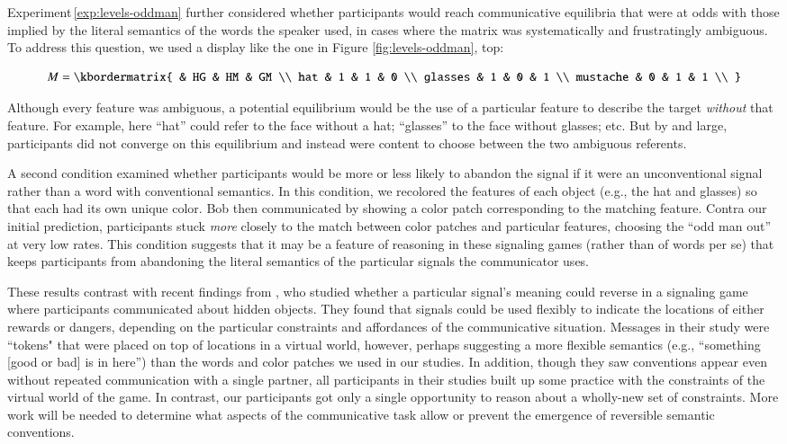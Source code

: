 \documentclass[man,noapacite]{apa2}
\newcounter{Experiment}
\newcommand{\exptref}[1]{Experiment\,\ref{#1}}
\begin{document}
\exptref{exp:levels-oddman} further considered whether participants would reach communicative equilibria that were at odds with those implied by the literal semantics of the words the speaker used, in cases where the matrix was systematically and frustratingly ambiguous. To address this question, we used a display like the one in Figure \ref{fig:levels-oddman}, top:

\begin{equation}
    M = \kbordermatrix{
               & HG & HM & GM \\
      hat      & 1  & 1  & 0  \\
      glasses  & 1  & 0  & 1 \\
      mustache & 0  & 1  & 1 \\
    }
\end{equation}

\noindent Although every feature was ambiguous, a potential equilibrium would be the use of a particular feature to describe the target \emph{without} that feature. For example, here ``hat'' could refer to the face without a hat; ``glasses'' to the face without glasses; etc. But by and large, participants did not converge on this equilibrium and instead were content to choose between the two ambiguous referents.

A second condition examined whether participants would be more or less likely to abandon the signal if it were an unconventional signal rather than a word with conventional semantics. In this condition, we recolored the features of each object (e.g., the hat and glasses) so that each had its own unique color. Bob then communicated by showing a color patch corresponding to the matching feature. Contra our initial prediction, participants stuck \emph{more} closely to the match between color patches and particular features, choosing the ``odd man out'' at very low rates. This condition suggests that it may be a feature of reasoning in these signaling games (rather than of words per se) that keeps participants from abandoning the literal semantics of the particular signals the communicator uses.

These results contrast with recent findings from , who studied whether a particular signal's meaning could reverse in a signaling game where participants communicated about hidden objects. They found that signals could be used flexibly to indicate the locations of either rewards or dangers, depending on the particular constraints and affordances of the communicative situation. Messages in their study were ``tokens" that were placed on top of locations in a virtual world, however, perhaps suggesting a more flexible semantics (e.g., ``something [good or bad] is in here'') than the words and color patches we used in our studies. In addition, though they saw conventions appear even without repeated communication with a single partner, all participants in their studies built up some practice with the constraints of the virtual world of the game. In contrast, our participants got only a single opportunity to reason about a wholly-new set of constraints. More work will be needed to determine what aspects of the communicative task allow or prevent the emergence of reversible semantic conventions.
\end{document}
